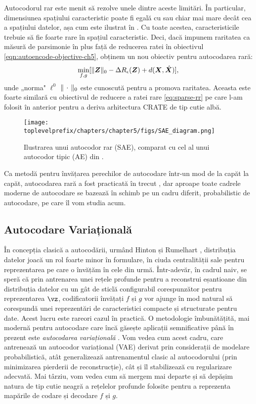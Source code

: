 \documentclass[../../book-main_ro.tex]{subfiles}
\begin{document}
Autocodorul rar este menit să rezolve unele dintre aceste limitări. În
particular, dimensiunea spațiului caracteristic poate fi egală cu sau
chiar mai mare decât cea a spațiului datelor, așa cum este ilustrat în
. Cu toate acestea, caracteristicile trebuie să fie foarte
rare în spațiul caracteristic. Deci, dacă impunem raritatea ca măsură
de parsimonie în plus față de reducerea ratei în obiectivul
\eqref{eqn:autoencode-objective-ch5}, obținem un nou obiectiv pentru
autocodarea rară:
\begin{equation}
  \min_{f, g}
  [\|\bm{Z}\|_0 - \Delta R_{\epsilon}(\bm{Z}) + d(\bm{X}, \hat {\bm{X}})],
  \label{eqn:autoencode-sparse}
\end{equation}
unde „norma" $\ell^0$ $\|\,\cdot\,\|_0$ este cunoscută pentru a promova raritatea.
Aceasta este foarte similară cu obiectivul de reducere a ratei rare
\eqref{eq:sparse-rr} pe care l-am folosit în  anterior pentru a deriva arhitectura CRATE de tip cutie albă.

\begin{figure}
  \centering
  \texttt{[image: \\toplevelprefix/chapters/chapter5/figs/SAE\_diagram.png]}
  \caption{Ilustrarea unui autocodor rar (SAE), comparat cu
  cel al unui autocodor tipic (AE) din . }
  \label{fig:SAE}
\end{figure}


Ca metodă pentru învățarea perechilor de autocodare într-un mod de la capăt la capăt, autocodarea
rară a fost practicată în trecut
\cite{Ranzato2006-oq,10.5555/3042573.3042641}, dar aproape toate cadrele moderne
de autocodare se bazează în schimb pe un cadru diferit, probabilistic
de autocodare, pe care îl vom studia acum.

\subsection{Autocodare Variațională}\label{sec:vae}

În concepția clasică a autocodării, urmând Hinton și Rumelhart
\cite{Rumelhart1986}, distribuția datelor joacă un rol foarte minor în
formulare, în ciuda centralității sale pentru reprezentarea pe care o
învățăm în cele din urmă. Într-adevăr, în cadrul naiv, se speră că prin antrenarea unei rețele profunde
pentru a reconstrui eșantioane din distribuția datelor cu un gât de sticlă configurabil
corespunzător pentru reprezentarea $\vz$, codificatorii învățați $f$ și $g$ vor
ajunge în mod natural să corespundă unei reprezentări de caracteristici
compacte și structurate pentru date. Acest lucru este rareori cazul în practică.
O metodologie îmbunătățită, mai modernă pentru autocodare care încă găsește
aplicații semnificative până în prezent este \textit{autocodarea variațională}
\cite{Kingma2013-sb,Kingma2019-zh}.
Vom vedea cum acest cadru, care antrenează un autocodor variațional (VAE)
derivat prin considerații de modelare probabilistică, atât generalizează
antrenamentul clasic al autocodorului (prin minimizarea pierderii de reconstrucție),
cât și îl stabilizează cu regularizare adecvată. Mai târziu, vom vedea cum să
mergem mai departe și să depășim natura de tip cutie neagră a rețelelor profunde folosite
pentru a reprezenta mapările de codare și decodare $f$ și $g$.
\end{document}
